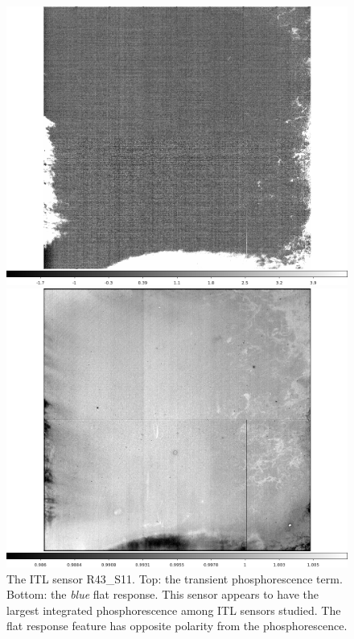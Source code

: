 \begin{figure}[!htbp]
\centering
\begin{minipage}{1.0\textwidth}    
  \centering
  \includegraphics[width=.6\linewidth]{sections/figures/phosphorescence-survey/stains_phos_R43_S11.png}    
\end{minipage}
\begin{minipage}{1.0\textwidth}
  \centering
  \includegraphics[width=.6\linewidth]{sections/figures/phosphorescence-survey/stains_abs_R43_S11.png}
\end{minipage}
\caption{The ITL sensor R43\_S11. Top: the transient phosphorescence term. Bottom: the {\it blue} flat response. This sensor appears to have the largest integrated phosphorescence among ITL sensors studied. The flat response feature has opposite polarity from the phosphorescence.}
\label{fig:phos:stains:R43S11}
\end{figure}


